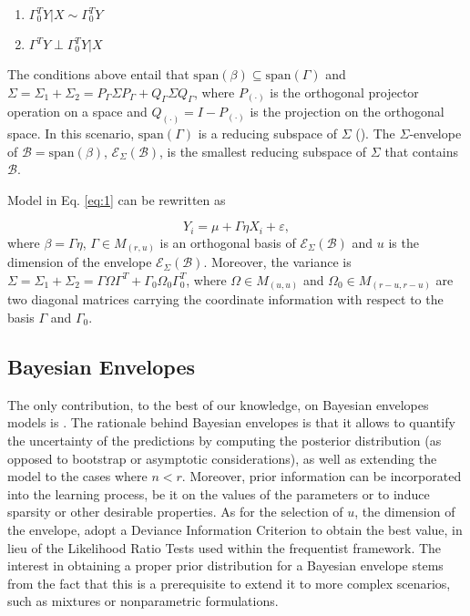 \documentclass[graybox]{svmult}
\begin{document}
\begin{enumerate}
\item $\Gamma_0^T Y | X \sim \Gamma_0^T Y$
\item $\Gamma^T Y \perp \Gamma_0^T Y | X$
\end{enumerate}

The conditions above entail that
$\mathrm{span}\left( \beta \right) \subseteq \mathrm{span}\left(
  \Gamma \right)$ and
$\Sigma = \Sigma_1 + \Sigma_2 = P_{\Gamma}\Sigma P_{\Gamma} +
Q_{\Gamma} \Sigma Q_{\Gamma}$, where $P_{\left(\cdot\right)}$ is the
orthogonal projector operation on a space and
$Q_{\left(\cdot\right)} = I - P_{\left(\cdot\right)}$ is the
projection on the orthogonal space. In this scenario,
$\mathrm{span}\left( \Gamma \right)$ is a reducing subspace of
$\Sigma$ (\cite{cookENVELOPEMODELSPARSIMONIOUS2010}). The $\Sigma$-envelope of $\mathcal{B} = \mathrm{span}\left( \beta \right)$, $\mathcal{E}_{\Sigma} \left( \mathcal{B} \right)$, is the smallest reducing subspace of $\Sigma$ that contains $\mathcal{B}$.

Model in Eq. \ref{eq:1} can be rewritten as

\begin{equation}
  \label{eq:3}
  Y_i = \mu + \Gamma \eta X_i + \varepsilon,
\end{equation}
where $\beta = \Gamma \eta$, $\Gamma \in M_{\left( r, u \right)}$ is
an orthogonal basis of
$\mathcal{E}_{\Sigma}\left( \mathcal{B} \right)$ and $u$ is the
dimension of the envelope
$\mathcal{E}_{\Sigma}\left( \mathcal{B} \right)$. Moreover, the
variance is
$\Sigma = \Sigma_1 + \Sigma_2 = \Gamma \Omega \Gamma^T + \Gamma_0
\Omega_0 \Gamma_0^T$, where $\Omega \in M_{\left( u, u \right)}$ and $\Omega_0 \in M_{\left( r-u, r-u \right)}$ are two diagonal matrices carrying the coordinate information with respect to the basis $\Gamma$ and $\Gamma_0$.

\subsection{Bayesian Envelopes}
The only contribution, to the best of our knowledge, on Bayesian
envelopes models is \cite{khareBayesianApproachEnvelope2017}. The
rationale behind Bayesian envelopes is that it allows to quantify the
uncertainty of the predictions by computing the posterior distribution
(as opposed to bootstrap or asymptotic considerations), as well as
extending the model to the cases where $n < r$. Moreover, prior
information can be incorporated into the learning process, be it on
the values of the parameters or to induce sparsity or other desirable
properties. As for the selection of $u$, the dimension of the
envelope, \cite{khareBayesianApproachEnvelope2017} adopt a Deviance
Information Criterion to obtain the best value, in lieu of the
Likelihood Ratio Tests used within the frequentist framework.  The
interest in obtaining a proper prior distribution for a Bayesian
envelope stems from the fact that this is a prerequisite to extend it
to more complex scenarios, such as mixtures or nonparametric
formulations.
\end{document}
